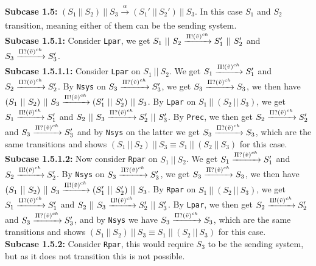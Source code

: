 \indent \textbf{Subcase 1.5: }$(S_1 \ || \ S_2)\ ||\ S_3 \xrightarrow[]{\alpha} (S_1' \ || \ S_2')\ ||\ S_3$. In this case $S_1$ and $S_2$ transition, meaning either of them can be the sending system.\\
\indent \indent \textbf{Subcase 1.5.1: } Consider \texttt{Lpar}, we get $S_1 \ || \ S_2 \xrightarrow[]{\Pi ! (\Tilde{v})^{ch}} S_1' \ || \ S_2'$ and $S_3 \xrightarrow[]{\Pi ? (\Tilde{v})^{ch}} S_3'$.\\
\indent \indent \indent \textbf{Subcase 1.5.1.1: } Consider \texttt{Lpar} on $S_1\ ||\ S_2$. We get $S_1 \xrightarrow[]{\Pi ! (\Tilde{v})^{ch}} S_1'$ and $S_2 \xrightarrow[]{\Pi ? (\Tilde{v})^{ch}} S_2'$. By \texttt{Nsys} on $S_3 \xrightarrow[]{\Pi ? (\Tilde{v})^{ch}} S_3'$, we get $S_3 \xrightarrow[]{\Pi ? (\Tilde{v})^{ch}} S_3$, we then have $(S_1 \ || \ S_2)\ ||\ S_3 \xrightarrow[]{\Pi ! (\Tilde{v})^{ch}} (S_1' \ || \ S_2')\ ||\ S_3$. By \texttt{Lpar} on $S_1 \ ||\ (S_2 \ || \ S_3)$, we get $S_1 \xrightarrow[]{\Pi ! (\Tilde{v})^{ch}} S_1'$ and $S_2 \ || \ S_3 \xrightarrow[]{\Pi ? (\Tilde{v})^{ch}} S_2' \ || \ S_3'$. By \texttt{Prec}, we then get $S_2 \xrightarrow[]{\Pi ? (\Tilde{v})^{ch}} S_2'$ and $S_3 \xrightarrow[]{\Pi ? (\Tilde{v})^{ch}} S_3'$ and by \texttt{Nsys} on the latter we get $S_3 \xrightarrow[]{\Pi ? (\Tilde{v})^{ch}} S_3$, which are the same transitions and shows $(S_1 \ ||\ S_2 )\ || \ S_3 \equiv S_1 \ ||\ (S_2 \ || \ S_3)$ for this case.\\
\indent \indent \indent \textbf{Subcase 1.5.1.2: } Now consider \texttt{Rpar} on $S_1\ ||\ S_2$. We get $S_1 \xrightarrow[]{\Pi ? (\Tilde{v})^{ch}} S_1'$ and $S_2 \xrightarrow[]{\Pi ! (\Tilde{v})^{ch}} S_2'$. By \texttt{Nsys} on $S_3 \xrightarrow[]{\Pi ? (\Tilde{v})^{ch}} S_3'$, we get $S_3 \xrightarrow[]{\Pi ? (\Tilde{v})^{ch}} S_3$, we then have $(S_1 \ || \ S_2)\ ||\ S_3 \xrightarrow[]{\Pi ! (\Tilde{v})^{ch}} (S_1' \ || \ S_2')\ ||\ S_3$. By \texttt{Rpar} on $S_1 \ ||\ (S_2 \ || \ S_3)$, we get $S_1 \xrightarrow[]{\Pi ? (\Tilde{v})^{ch}} S_1'$ and $S_2 \ || \ S_3 \xrightarrow[]{\Pi ! (\Tilde{v})^{ch}} S_2' \ || \ S_3'$. By \texttt{Lpar}, we then get $S_2 \xrightarrow[]{\Pi ! (\Tilde{v})^{ch}} S_2'$ and $S_3 \xrightarrow[]{\Pi ? (\Tilde{v})^{ch}} S_3'$, and by \texttt{Nsys} we have $S_3 \xrightarrow[]{\Pi ? (\Tilde{v})^{ch}} S_3$, which are the same transitions and shows $(S_1 \ ||\ S_2 )\ || \ S_3 \equiv S_1 \ ||\ (S_2 \ || \ S_3)$ for this case.\\
\indent \indent \textbf{Subcase 1.5.2: } Consider \texttt{Rpar}, this would require $S_3$ to be the sending system, but as it does not transition this is not possible.\\

